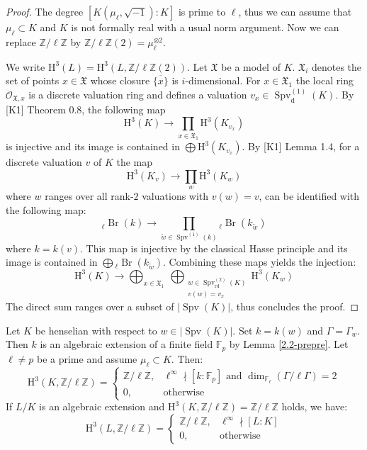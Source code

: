 \begin{proof}
The degree $[K(\mu_\ell, \sqrt{-1}):K]$ is prime to $\ell$, thus we can assume that $\mu_\ell\subset K$ and $K$ is not formally real with a usual norm argument. Now we can replace $\mathbb{Z}/\ell\mathbb{Z}$ by $\mathbb{Z}/\ell\mathbb{Z}(2) = \mu_\ell^{\otimes 2}$.

We write $\mathrm{H}^3(L) = \mathrm{H}^3(L, \mathbb{Z}/\ell\mathbb{Z}(2))$. Let $\mathfrak{X}$ be a model of $K$. $\mathfrak{X}_i$ denotes the set of points $x\in\mathfrak{X}$ whose closure $\overline{\{x\}}$ is $i$-dimensional. For $x\in\mathfrak{X}_1$ the local ring $\mathcal{O}_{\mathfrak{X}, x}$ is a discrete valuation ring and defines a valuation $v_x\in\operatorname{Spv}_\text{d}^{(1)}(K)$. By [K1] Theorem 0.8, the following map
\[ \mathrm{H}^3(K)\longrightarrow \prod_{x\in\mathfrak{X}_1}\mathrm{H}^3(K_{v_x}) \]
is injective and its image is contained in $\bigoplus \mathrm{H}^3(K_{v_x})$. By [K1] Lemma 1.4, for a discrete valuation $v$ of $K$ the map
\[ \mathrm{H}^3(K_v) \longrightarrow \prod_w\mathrm{H}^3(K_w) \]
where $w$ ranges over all rank-$2$ valuations with $v(w) = v$, can be identified with the following map:
\[ {}_\ell\operatorname{Br}(k) \longrightarrow \prod_{\tilde{w}\in\operatorname{Spv}^{(1)}(k)} {}_\ell\operatorname{Br}(k_{\tilde{w}}) \]
where $k = k(v)$. This map is injective by the classical Hasse principle and its image is contained in $\bigoplus {}_\ell\operatorname{Br}(k_{\tilde{w}})$. Combining these maps yields the injection:
\[ \mathrm{H}^3(K)\longrightarrow \bigoplus_{x\in\mathfrak{X}_1}\  \bigoplus_{\substack{w\in\operatorname{Spv}_\text{rd}^{(2)}(K) \\ v(w) = v_x}} \mathrm{H}^3(K_w) \]
The direct sum ranges over a subset of $|\operatorname{Spv}(K)|$, thus concludes the proof.
\end{proof}

\begin{lemma}\label{2.5}
Let $K$ be henselian with respect to $w\in|\operatorname{Spv}(K)|$. Set $k=k(w)$ and $\Gamma = \Gamma_w$. Then $k$ is an algebraic extension of a finite field $\mathbb{F}_p$ by Lemma \ref{2.2-prepre}. Let $\ell\neq p$ be a prime and assume $\mu_\ell\subset K$. Then:
\[ \mathrm{H}^3(K, \mathbb{Z}/\ell\mathbb{Z}) = \begin{cases}
\mathbb{Z}/\ell\mathbb{Z}, & \ell^\infty\nmid [k:\mathbb{F}_p] \text{ and } \dim_{\mathbb{F}_\ell}(\Gamma / \ell\Gamma) = 2\\
0, & \text{otherwise}
\end{cases} \]
If $L/K$ is an algebraic extension and $\mathrm{H}^3(K, \mathbb{Z}/\ell\mathbb{Z}) = \mathbb{Z}/\ell\mathbb{Z}$ holds, we have:
\[ \mathrm{H}^3(L,\mathbb{Z}/\ell\mathbb{Z}) = \begin{cases}
\mathbb{Z}/\ell\mathbb{Z}, & \ell^\infty\nmid [L:K]\\
0, & \text{otherwise}
\end{cases} \]
\end{lemma}

